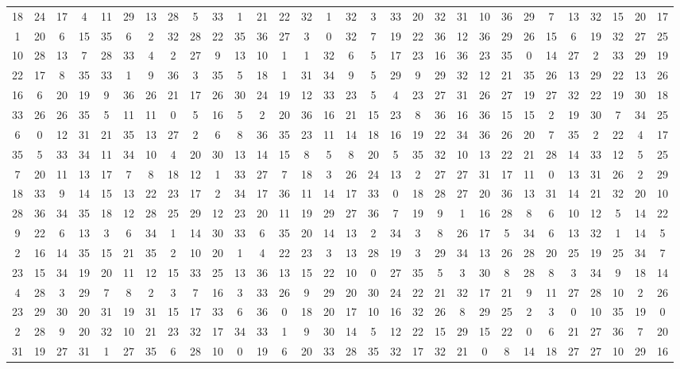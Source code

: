 \documentclass[11pt,twoside]{article}
\numberwithin{Theorem}{section}
\numberwithin{Definition}{section}
\numberwithin{Lemma}{section}
\numberwithin{Algorithm}{section}
\numberwithin{equation}{section}
\begin{document}
\begin{sideways}
\begin{minipage}[b]{0.9\textheight}
\begin{tabular}{|*{30}{c|}}
18 &24 &17 &4 &11 &29 &13 &28 &5 &33 &1 &21 &22 &32 &1&32 &3 &33 &20 &32 &31 &10 &36 &29 &7 &13 &32 &15 &20 &17\\
1 &20 &6 &15 &35 &6 &2 &32 &28 &22 &35 &36 &27 &3 &0&32 &7 &19 &22 &36 &12 &36 &29 &26 &15 &6 &19 &32 &27 &25\\
10 &28 &13 &7 &28 &33 &4 &2 &27 &9 &13 &10 &1 &1 &32&6 &5 &17 &23 &16 &36 &23 &35 &0 &14 &27 &2 &33 &29 &19\\
22 &17 &8 &35 &33 &1 &9 &36 &3 &35 &5 &18 &1 &31 &34&9 &5 &29 &9 &29 &32 &12 &21 &35 &26 &13 &29 &22 &13 &26\\
16 &6 &20 &19 &9 &36 &26 &21 &17 &26 &30 &24 &19 &12 &33&23 &5 &4 &23 &27 &31 &26 &27 &19 &27 &32 &22 &19 &30 &18\\
33 &26 &26 &35 &5 &11 &11 &0 &5 &16 &5 &2 &20 &36 &16&21 &15 &23 &8 &36 &16 &36 &15 &15 &2 &19 &30 &7 &34 &25\\
6 &0 &12 &31 &21 &35 &13 &27 &2 &6 &8 &36 &35 &23 &11&14 &18 &16 &19 &22 &34 &36 &26 &20 &7 &35 &2 &22 &4 &17\\
35 &5 &33 &34 &11 &34 &10 &4 &20 &30 &13 &14 &15 &8 &5&8 &20 &5 &35 &32 &10 &13 &22 &21 &28 &14 &33 &12 &5 &25\\
7 &20 &11 &13 &17 &7 &8 &18 &12 &1 &33 &27 &7 &18 &3&26 &24 &13 &2 &27 &27 &31 &17 &11 &0 &13 &31 &26 &2 &29\\
18 &33 &9 &14 &15 &13 &22 &23 &17 &2 &34 &17 &36 &11 &14&17 &33 &0 &18 &28 &27 &20 &36 &13 &31 &14 &21 &32 &20 &10\\
28 &36 &34 &35 &18 &12 &28 &25 &29 &12 &23 &20 &11 &19 &29&27 &36 &7 &19 &9 &1 &16 &28 &8 &6 &10 &12 &5 &14 &22\\
9 &22 &6 &13 &3 &6 &34 &1 &14 &30 &33 &6 &35 &20 &14&13 &2 &34 &3 &8 &26 &17 &5 &34 &6 &13 &32 &1 &14 &5\\
2 &16 &14 &35 &15 &21 &35 &2 &10 &20 &1 &4 &22 &23 &3&13 &28 &19 &3 &29 &34 &13 &26 &28 &20 &25 &19 &25 &34 &7\\
23 &15 &34 &19 &20 &11 &12 &15 &33 &25 &13 &36 &13 &15 &22&10 &0 &27 &35 &5 &3 &30 &8 &28 &8 &3 &34 &9 &18 &14\\
4 &28 &3 &29 &7 &8 &2 &3 &7 &16 &3 &33 &26 &9 &29&20 &30 &24 &22 &21 &32 &17 &21 &9 &11 &27 &28 &10 &2 &26\\
23 &29 &30 &20 &31 &19 &31 &15 &17 &33 &6 &36 &0 &18 &20&17 &10 &16 &32 &26 &8 &29 &25 &2 &3 &0 &10 &35 &19 &0\\
2 &28 &9 &20 &32 &10 &21 &23 &32 &17 &34 &33 &1 &9 &30&14 &5 &12 &22 &15 &29 &15 &22 &0 &6 &21 &27 &36 &7 &20\\
31 &19 &27 &31 &1 &27 &35 &6 &28 &10 &0 &19 &6 &20 &33&28 &35 &32 &17 &32 &21 &0 &8 &14 &18 &27 &27 &10 &29 &16\\

\end{tabular}
\end{minipage}
\end{sideways}
\end{document}
